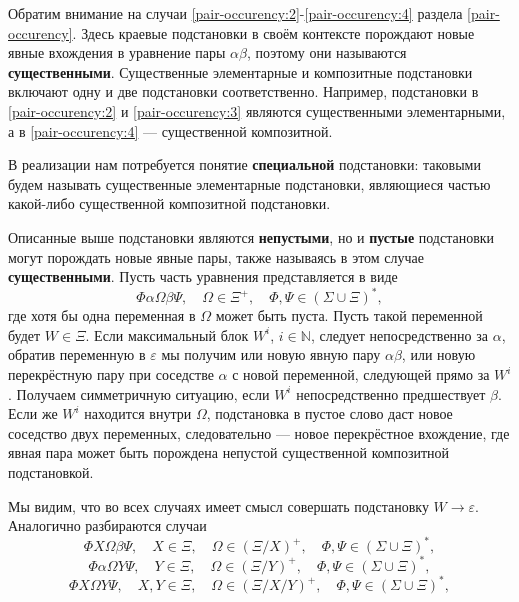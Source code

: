 \documentclass[12pt]{article}
\begin{document}
Обратим внимание на случаи \ref{pair-occurency:2}-\ref{pair-occurency:4}
раздела \ref{pair-occurency}. Здесь краевые подстановки в своём контексте
порождают новые явные вхождения в уравнение пары $\alpha \beta$, поэтому они
называются \textbf{существенными}. Существенные элементарные и композитные
подстановки включают одну и две подстановки соответственно. Например,
подстановки в \ref{pair-occurency:2} и \ref{pair-occurency:3} являются
существенными элементарными, а в \ref{pair-occurency:4} --- существенной
композитной.

В реализации нам потребуется понятие \textbf{специальной} подстановки: таковыми
будем называть существенные элементарные подстановки, являющиеся частью
какой-либо существенной композитной подстановки.

Описанные выше подстановки являются \textbf{непустыми}, но и \textbf{пустые}
подстановки могут порождать новые явные пары, также называясь в этом случае
\textbf{существенными}. Пусть часть уравнения представляется в виде
\begin{equation}
  \Phi \alpha \Omega \beta \Psi, \quad \Omega \in \Xi^+, \quad \Phi, \Psi \in
  (\Sigma \cup \Xi)^*,
\end{equation}
где хотя бы одна переменная в $\Omega$ может быть пуста. Пусть такой переменной
будет $W \in \Xi$. Если максимальный блок $W^i$, $i \in \mathbb{N}$, следует
непосредственно за $\alpha$, обратив переменную в $\varepsilon$ мы получим или
новую явную пару $\alpha \beta$, или новую перекрёстную пару при соседстве
$\alpha$ с новой переменной, следующей прямо за $W^i$. Получаем симметричную
ситуацию, если $W^i$ непосредственно предшествует $\beta$. Если же $W^i$
находится внутри $\Omega$, подстановка в пустое слово даст новое соседство двух
переменных, следовательно --- новое перекрёстное вхождение, где явная пара
может быть порождена непустой существенной композитной подстановкой.

Мы видим, что во всех случаях имеет смысл совершать подстановку $W \to
\varepsilon$. Аналогично разбираются случаи
\begin{equation}
  \Phi X \Omega \beta \Psi, \quad X \in \Xi, \quad \Omega \in (\Xi / X)^+,
  \quad \Phi, \Psi \in (\Sigma \cup \Xi)^*,
\end{equation}
\begin{equation}
  \Phi \alpha \Omega Y \Psi, \quad Y \in \Xi, \quad \Omega \in (\Xi / Y)^+,
  \quad \Phi, \Psi \in (\Sigma \cup \Xi)^*,
\end{equation}
\begin{equation}
  \Phi X \Omega Y \Psi, \quad X, Y \in \Xi, \quad \Omega \in (\Xi / X / Y)^+,
  \quad \Phi, \Psi \in (\Sigma \cup \Xi)^*,
\end{equation}
\end{document}
